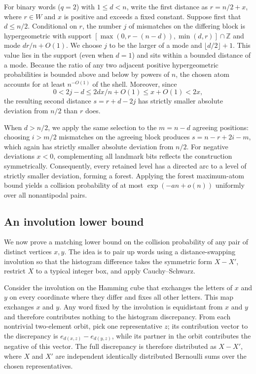 For binary words ($q=2$) with $1\le d<n$, write the first distance as $r=n/2+x$, where $r\in W$ and $x$ is positive and exceeds a fixed constant. Suppose first that $d\le n/2$. Conditional on $r$, the number $j$ of mismatches on the differing block is hypergeometric with support $[\max(0,r-(n-d)),\min(d,r)]\cap\mathbb Z$ and mode $dr/n+O(1)$. We choose $j$ to be the larger of a mode and $\lfloor d/2\rfloor+1$. This value lies in the support (even when $d=1$) and sits within a bounded distance of a mode. Because the ratio of any two adjacent positive hypergeometric probabilities is bounded above and below by powers of $n$, the chosen atom accounts for at least $n^{-O(1)}$ of the shell. Moreover, since
\[
 0<2j-d\le 2dx/n+O(1)\le x+O(1)<2x,
\]
the resulting second distance $s=r+d-2j$ has strictly smaller absolute deviation from $n/2$ than $r$ does.

When $d>n/2$, we apply the same selection to the $m=n-d$ agreeing positions: choosing $i>m/2$ mismatches on the agreeing block produces $s=n-r+2i-m$, which again has strictly smaller absolute deviation from $n/2$. For negative deviations $x<0$, complementing all landmark bits reflects the construction symmetrically. Consequently, every retained level has a directed arc to a level of strictly smaller deviation, forming a forest. Applying the forest maximum-atom bound yields a collision probability of at most $\exp(-an+o(n))$ uniformly over all nonantipodal pairs.

\subsection{An involution lower bound}
We now prove a matching lower bound on the collision probability of any pair of distinct vertices $x,y$. The idea is to pair up words using a distance-swapping involution so that the histogram difference takes the symmetric form $X-X'$, restrict $X$ to a typical integer box, and apply Cauchy--Schwarz.

Consider the involution on the Hamming cube that exchanges the letters of $x$ and $y$ on every coordinate where they differ and fixes all other letters. This map exchanges $x$ and $y$. Any word fixed by the involution is equidistant from $x$ and $y$ and therefore contributes nothing to the histogram discrepancy. From each nontrivial two-element orbit, pick one representative $z$; its contribution vector to the discrepancy is $e_{d(x,z)}-e_{d(y,z)}$, while its partner in the orbit contributes the negative of this vector. The full discrepancy is therefore distributed as $X-X'$, where $X$ and $X'$ are independent identically distributed Bernoulli sums over the chosen representatives.

